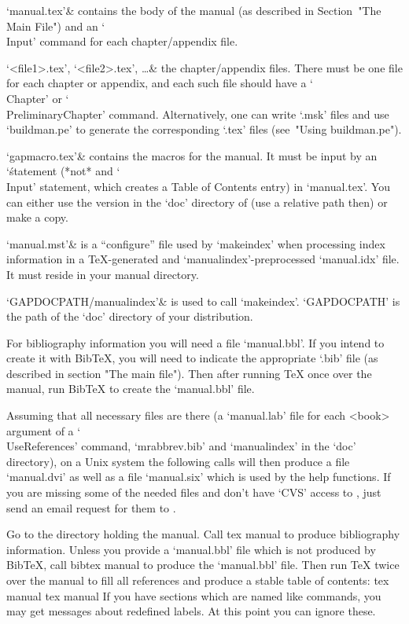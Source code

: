 \beginitems
`manual.tex'&
    contains the body of the manual
    (as described in Section~"The Main File")
    and an `\\Input' command for each chapter/appendix file.

`<file1>.tex', `<file2>.tex', \dots &
    the chapter/appendix files. There must be one file for each chapter
    or appendix, and each such file should have a `\\Chapter' or
    `\\PreliminaryChapter' command. Alternatively, one can write
    `.msk' files and use `buildman.pe' to generate the corresponding
    `.tex' files (see~"Using buildman.pe").

`gapmacro.tex'&
    contains the macros for the manual.
    It must be input by an `\' statement (*not* and `\\Input'
    statement, which creates a Table of Contents entry) in `manual.tex'.
    You can either use the version in the `doc' directory of {\GAP}
    (use a relative path then) or make a copy.

`manual.mst'&
    is a ``configure'' file used by `makeindex' when processing
    index information in a {\TeX}-generated and `manualindex'-preprocessed
    `manual.idx' file.
    It must reside in your manual directory.

`GAPDOCPATH/manualindex'&
    is used to call `makeindex'.
    `GAPDOCPATH' is the path of the `doc' directory of your {\GAP}
    distribution.
\enditems

For bibliography information you will need a file `manual.bbl'. If you
intend to create it with Bib{\TeX}, you will need to indicate the
appropriate `.bib' file (as described in section "The main file"). Then
after running {\TeX} once over the manual, run Bib{\TeX} to create the
`manual.bbl' file.

Assuming that all necessary files are there (a `manual.lab' file for each
<book> argument of a `\\UseReferences' command, `mrabbrev.bib' and
`manualindex' in the {\GAP} `doc' directory),
on a Unix system the following calls will then produce a file `manual.dvi'
as well as a file `manual.six' which is used by the {\GAP} help functions.
If you are missing some of the needed files and don't have `CVS' access to
{\GAP}, just send an email request for them to
.

Go to the directory holding the manual. Call
\begintt
tex manual
\endtt
to produce bibliography information. Unless you provide a `manual.bbl' file
which is not produced by Bib{\TeX}, call
\begintt
bibtex manual
\endtt
to produce the `manual.bbl' file. Then run {\TeX} twice over the manual to
fill all references and produce a stable table of contents:
\begintt
tex manual
tex manual
\endtt
If you have sections which are named like commands, you may get messages
about redefined labels. At this point you can ignore these.

